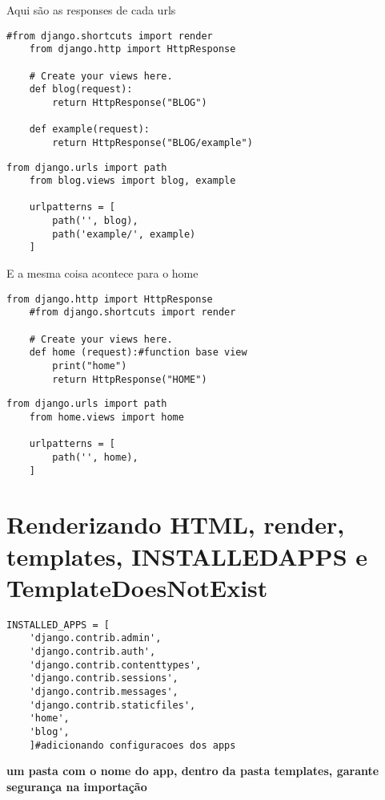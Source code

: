 \documentclass{article}
\begin{document}
Aqui são as responses de cada urls
\begin{lstlisting}[style=pythonStyle, caption={blog/views.py}]
    #from django.shortcuts import render
    from django.http import HttpResponse

    # Create your views here.
    def blog(request):
        return HttpResponse("BLOG")

    def example(request):
        return HttpResponse("BLOG/example")
\end{lstlisting}

\begin{lstlisting}[style=pythonStyle, caption={blog/urls.py}]
    from django.urls import path
    from blog.views import blog, example

    urlpatterns = [
        path('', blog),
        path('example/', example)
    ]
\end{lstlisting}
E a mesma coisa acontece para o home

\begin{lstlisting}[style=pythonStyle, caption={home/views.py}]
    from django.http import HttpResponse
    #from django.shortcuts import render

    # Create your views here.
    def home (request):#function base view
        print("home")
        return HttpResponse("HOME")

\end{lstlisting}

\begin{lstlisting}[style=pythonStyle, caption={home/urls.py}]
    from django.urls import path
    from home.views import home

    urlpatterns = [
        path('', home),
    ]
\end{lstlisting}

\section{Renderizando HTML, render, templates, INSTALLEDAPPS e TemplateDoesNotExist}

\begin{lstlisting}[style=pythonStyle, caption={project/settings.py}]
    INSTALLED_APPS = [
    'django.contrib.admin',
    'django.contrib.auth',
    'django.contrib.contenttypes',
    'django.contrib.sessions',
    'django.contrib.messages',
    'django.contrib.staticfiles',
    'home',
    'blog',
    ]#adicionando configuracoes dos apps
\end{lstlisting}
\textbf{um pasta com o nome do app, dentro da pasta templates, garante segurança na importação}
\end{document}
